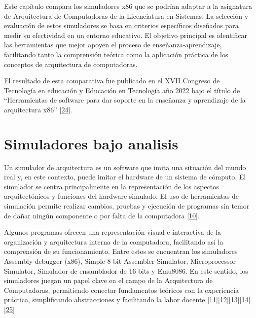 \documentclass[12pt,twoside]{templates/unerthesis}
\begin{document}
Este capítulo compara los simuladores x86 que se podrían adaptar a la asignatura de Arquitectura de Computadoras de la Licenciatura en Sistemas. La selección y evaluación de estos simuladores se basa en criterios específicos diseñados para medir su efectividad en un entorno educativo. El objetivo principal es identificar las herramientas que mejor apoyen el proceso de enseñanza-aprendizaje, facilitando tanto la comprensión teórica como la aplicación práctica de los conceptos de arquitectura de computadoras.

El resultado de esta comparativa fue publicado en el XVII Congreso de Tecnología en educación y Educación en Tecnología año 2022 bajo el título de ``Herramientas de software para dar soporte en la enseñanza y aprendizaje de la arquitectura x86'' {[}\protect\hyperlink{ref-colombani_herramientas_2022}{24}{]}.

\hypertarget{simuladores-bajo-analisis}{%
\section{Simuladores bajo analisis}\label{simuladores-bajo-analisis}}

Un simulador de arquitectura es un software que imita una situación del mundo real y, en este contexto, puede imitar el hardware de un sistema de cómputo. El simulador se centra principalmente en la representación de los aspectos arquitectónicos y funciones del hardware simulado. El uso de herramientas de simulación permite realizar cambios, pruebas y ejecución de programas sin temor de dañar ningún componente o por falta de la computadora {[}\protect\hyperlink{ref-radivojevic_design_2011}{10}{]}.

Algunos programas ofrecen una representación visual e interactiva de la organización y arquitectura interna de la computadora, facilitando así la comprensión de su funcionamiento. Entre estos se encuentran los simuladores Assembly debugger (x86), Simple 8-bit Assembler Simulator, Microprocessor Simulator, Simulador de ensamblador de 16 bits y Emu8086. En este sentido, los simuladores juegan un papel clave en el campo de la Arquitectura de Computadoras, permitiendo conectar fundamentos teóricos con la experiencia práctica, simplificando abstracciones y facilitando la labor docente {[}\protect\hyperlink{ref-nikolic_survey_2009}{11}{]}{[}\protect\hyperlink{ref-hasan_survey_2012}{12}{]}{[}\protect\hyperlink{ref-hennessy_computer_2012}{13}{]}{[}\protect\hyperlink{ref-stallings_computer_2013}{14}{]}{[}\protect\hyperlink{ref-behrooz_computer_2005}{25}{]}
\end{document}
